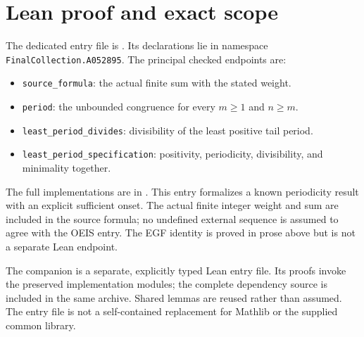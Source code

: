 \documentclass[11pt,a4paper]{article}
\theoremstyle{remark}
\begin{document}
\section{Lean proof and exact scope}
The dedicated entry file is . Its declarations lie in namespace \texttt{FinalCollection.A052895}. The principal checked endpoints are:
\begin{itemize}[nosep]
\item \texttt{source\_formula}: the actual finite sum with the stated weight.
\item \texttt{period}: the unbounded congruence for every $m\ge1$ and $n\ge m$.
\item \texttt{least\_period\_divides}: divisibility of the least positive tail period.
\item \texttt{least\_period\_specification}: positivity, periodicity, divisibility, and minimality together.
\end{itemize}
The full implementations are in .
This entry formalizes a known periodicity result with an explicit sufficient onset. The actual finite integer weight and sum are included in the source formula; no undefined external sequence is assumed to agree with the OEIS entry. The EGF identity is proved in prose above but is not a separate Lean endpoint. 

The companion is a separate, explicitly typed Lean entry file. Its proofs
invoke the preserved implementation modules; the complete dependency source
is included in the same archive. Shared lemmas are reused rather than
assumed. The entry file is not a self-contained replacement for Mathlib or
the supplied common library.
\end{document}
